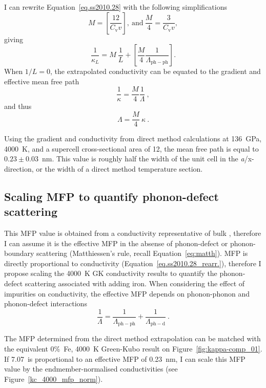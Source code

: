 I can rewrite Equation~\ref{eq.ss2010.28} with the following simplifications 
%
$$M = \left [ \frac{12}{C_{\mathrm{v}}v} \right ],\ \mathrm{and}\ \frac{M}{4}= \frac{3}{C_{\mathrm{v}}v},$$
%
giving
%
\begin{equation} 
\frac{1}{\kappa_{L}}= M\ \frac{1}{L}+\left [ \frac{M}{4} \frac{1}{\Lambda_{\mathrm{ph-ph}}} \right ]. 
\label{eq.ss2010.28_simp}
\end{equation}
%
When $1/L = 0$, the extrapolated conductivity can be equated to the gradient and effective mean free path
%
$$ \frac{1}{\kappa}=  \frac{M}{4} \frac{1}{\Lambda}\ ,$$
%
and thus 
%
\begin{equation}
\Lambda = \frac{M}{4}\ \kappa \ .
\label{eq.ss2010.28_rearr.}
\end{equation}

Using the gradient and conductivity from direct method calculations at 136~GPa, 4000~K, and a supercell cross-sectional area of 12, the mean free path is equal to $0.23\pm0.03$~nm. This value is roughly half the width of the unit cell in the \textit{a}/x-direction, or the width of a direct method temperature section.



\subsection{Scaling MFP to quantify phonon-defect scattering}

This MFP value is obtained from a conductivity representative of bulk \mgsios \bdg, therefore I can assume it is the effective MFP in the absense of phonon-defect or phonon-boundary scattering (Matthiessen's rule, recall Equation~\ref{eq:matth}). MFP is directly proportional to conductivity (Equation~\ref{eq.ss2010.28_rearr.}), therefore I propose scaling the 4000~K GK conductivity results to quantify the phonon-defect scattering associated with adding iron. When considering the effect of impurities on conductivity, the effective MFP depends on phonon-phonon and phonon-defect interactions
%
\begin{equation}
\frac{1}{\Lambda}=\frac{1}{\Lambda_{\mathrm{ph-ph}}}+\frac{1}{\Lambda_{\mathrm{ph-d}}}\ .
\label{eq:matth_mfp_mod}
\end{equation}

The MFP determined from the direct method extrapolation can be matched with the equivalent 0\%~Fe, 4000~K Green-Kubo result on Figure~\ref{fig:kappa-comp_01}. If 7.07~\wmks is proportional to an effective MFP of 0.23~nm, I can scale this MFP value by the \mgsios endmember-normalised conductivities (see Figure~\ref{kc_4000_mfp_norm}). 

